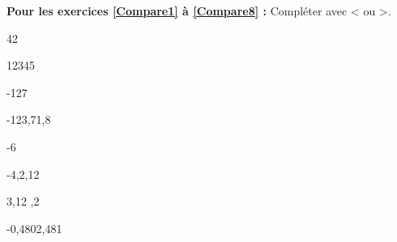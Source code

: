 \textbf{Pour les exercices \ref{Compare1} à \ref{Compare8} : } Compléter avec < ou >.

\begin{multicols}{4}
    42

    12345
    
    -127

    -123,71,8
\end{multicols}

\begin{multicols}{4}
    -6

    -4,2,12
    
    3,12 ,2

    -0,4802,481
\end{multicols}